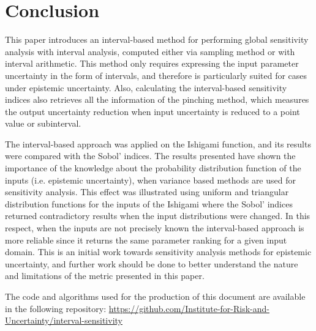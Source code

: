 \documentclass[twocolumn]{rps-esrel2022}
\begin{document}
\section{Conclusion}

This paper introduces an interval-based method for performing global sensitivity analysis with interval analysis, computed either
via sampling method or with interval arithmetic.
This method only requires expressing the input parameter uncertainty in the form of intervals, and therefore is particularly
suited for cases under epistemic uncertainty.
Also, calculating the interval-based sensitivity indices also retrieves all the information of the pinching method,
which measures the output uncertainty reduction when input uncertainty is reduced to a point value or subinterval.

The interval-based approach was applied on the Ishigami function, and its results were compared with the Sobol' indices. The results presented have shown the importance of the  knowledge about the probability distribution function of the inputs (i.e. epistemic uncertainty), when variance based methods are used for sensitivity analysis.  
This effect was illustrated using uniform and triangular distribution functions for the inputs of the Ishigami where the Sobol' indices returned contradictory results when the input distributions were changed.
In this respect, when the inputs are not precisely known the interval-based approach is more reliable since it returns the same parameter ranking for a given input domain.
This is an initial work towards sensitivity analysis methods for epistemic uncertainty, and further work should be done to better understand the nature and limitations of the metric presented in this paper.

The code and algorithms used for the production of this document are available in the following repository: \url{https://github.com/Institute-for-Risk-and-Uncertainty/interval-sensitivity}

\end{document}
